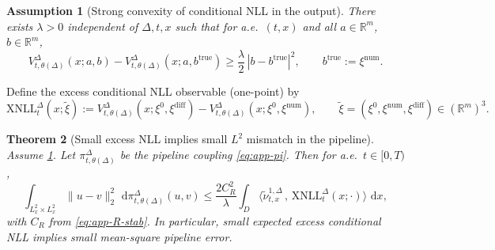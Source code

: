 \documentclass{article}
\numberwithin{equation}{section}
\theoremstyle{plain}
\newtheorem{theorem}{Theorem}[section]
\newtheorem{assumption}[theorem]{Assumption}
\theoremstyle{definition}
\theoremstyle{remark}
\newcommand{\R}{\mathbb{R}}
\newcommand{\dd}{\,\mathrm{d}}
\begin{document}
\begin{assumption}[Strong convexity of conditional NLL in the output]\label{ass:app-strong-conv}
There exists $\lambda>0$ independent of $\Delta,t,x$ such that for a.e.\ $(t,x)$ and all $a\in\R^m$, $b\in\R^m$,
\[
V^\Delta_{t,\theta(\Delta)}(x;a,b)-V^\Delta_{t,\theta(\Delta)}(x;a,b^{\mathrm{true}})
\ge \frac{\lambda}{2}\,|b-b^{\mathrm{true}}|^2,
\qquad b^{\mathrm{true}}:=\xi^{\mathrm{num}}.
\]
\end{assumption}

Define the excess conditional NLL observable (one-point) by
\[
\mathrm{XNLL}^\Delta_{t}(x;\widetilde\xi)
:=
V^\Delta_{t,\theta(\Delta)}(x;\xi^0,\xi^{\mathrm{diff}})
-
V^\Delta_{t,\theta(\Delta)}(x;\xi^0,\xi^{\mathrm{num}}),
\qquad \widetilde\xi=(\xi^0,\xi^{\mathrm{num}},\xi^{\mathrm{diff}})\in(\R^m)^3.
\]

\begin{theorem}[Small excess NLL implies small $L^2$ mismatch in the pipeline]
\label{thm:app-xnll-to-mse}
Assume \cref{ass:app-strong-conv}. Let $\pi^\Delta_{t,\theta(\Delta)}$ be the pipeline coupling \eqref{eq:app-pi}.
Then for a.e.\ $t\in[0,T)$,
\begin{equation}\label{eq:xnll-to-mse}
\int_{L^2_x \times L^2_x}\|u-v\|_{2}^2\,\dd\pi^\Delta_{t,\theta(\Delta)}(u,v)
\le \frac{2C_R^2}{\lambda}\int_D 
\Big\langle \widetilde\nu^{1,\Delta}_{t,x}\,,\,\mathrm{XNLL}^\Delta_t(x;\cdot)\Big\rangle\,\dd x,
\end{equation}
with $C_R$ from \eqref{eq:app-R-stab}. In particular, small expected excess conditional NLL implies small mean-square pipeline error.
\end{theorem}
\end{document}
